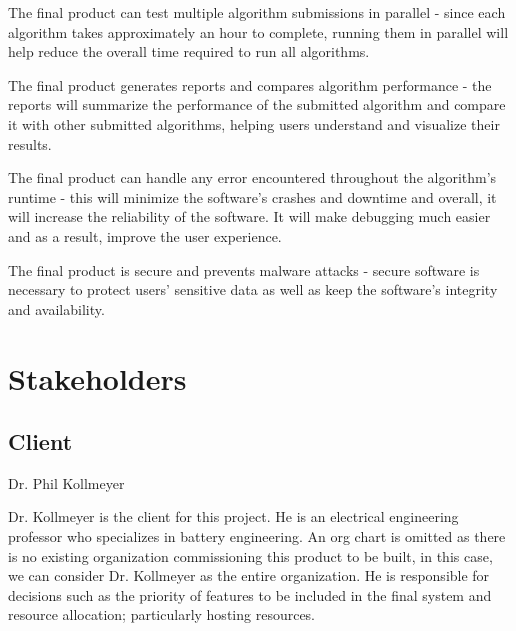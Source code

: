 \documentclass[12pt]{article}
\begin{document}
    The final product can test multiple algorithm submissions in parallel - since each algorithm takes approximately an hour to complete, running them in parallel will help reduce the overall time required to run all algorithms.
    
    The final product generates reports and compares algorithm performance - the reports will summarize the performance of the submitted algorithm and compare it with other submitted algorithms, helping users understand and visualize their results.
    
    The final product can handle any error encountered throughout the algorithm’s runtime - this will minimize the software’s crashes and downtime and overall, it will increase the reliability of the software. It will make debugging much easier and as a result, improve the user experience.
    
    The final product is secure and prevents malware attacks - secure software is necessary to protect users’ sensitive data as well as keep the software’s integrity and availability.

\section{Stakeholders}
\subsection{Client}
Dr. Phil Kollmeyer

Dr. Kollmeyer is the client for this project. He is an electrical engineering professor who specializes in battery engineering. An org chart is omitted as there is no existing organization commissioning this product to be built, in this case, we can consider Dr. Kollmeyer as the entire organization. He is responsible for decisions such as the priority of features to be included in the final system and resource allocation; particularly hosting resources.
\end{document}
